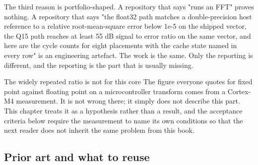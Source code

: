 The third reason is portfolio-shaped. A repository that says "runs an FFT"
proves nothing. A repository that says "the float32 path matches a
double-precision host reference to a relative root-mean-square error below 1e-5
on the shipped vector, the Q15 path reaches at least 55 dB signal to error
ratio on the same vector, and here are the cycle counts for eight placements
with the cache state named in every row" is an engineering artefact. The work
is the same. Only the reporting is different, and the reporting is the part
that is usually missing.

\begin{note}{The widely repeated ratio is not for this core}
The figure everyone quotes for fixed point against floating point on a
microcontroller transform comes from a Cortex-M4 measurement. It is not wrong
there; it simply does not describe this part. This chapter treats it as a
hypothesis rather than a result, and the acceptance criteria below require the
measurement to name its own conditions so that the next reader does not inherit
the same problem from this book.
\end{note}

\subsection*{Prior art and what to reuse}


